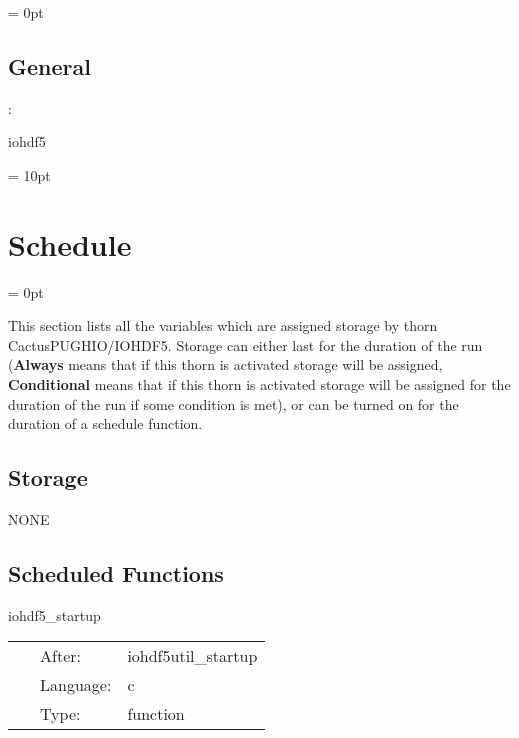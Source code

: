 \documentclass{article}
\begin{document}
\parskip = 0pt

\vspace{3mm} \subsection*{General}

: 

iohdf5
\vspace{2mm}

\vspace{5mm}\parskip = 10pt 

\section{Schedule} 


\parskip = 0pt


\noindent This section lists all the variables which are assigned storage by thorn CactusPUGHIO/IOHDF5.  Storage can either last for the duration of the run ({\bf Always} means that if this thorn is activated storage will be assigned, {\bf Conditional} means that if this thorn is activated storage will be assigned for the duration of the run if some condition is met), or can be turned on for the duration of a schedule function.


\subsection*{Storage}NONE
\subsection*{Scheduled Functions}
\vspace{5mm}


\hspace{5mm} iohdf5\_startup 

\hspace{5mm}{\it iohdf5 startup routine } 


\hspace{5mm}

 \begin{tabular*}{160mm}{cll} 
~ & After:  & iohdf5util\_startup \\ 
~ & Language:  & c \\ 
~ & Type:  & function \\ 
\end{tabular*} 
\end{document}
